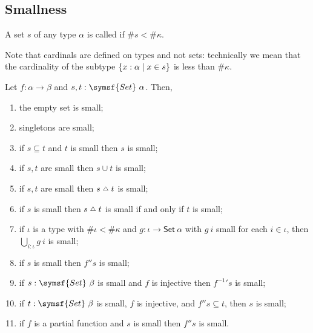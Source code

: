 \subsection{Smallness}

\begin{definition}
    A set \( s \) of any type \( \alpha \) is called  if \( \#s < \#\kappa \).
\end{definition}
\begin{remark}
    Note that cardinals are defined on types and not sets: technically we mean that the cardinality of the subtype \( \qty{x : \alpha \mid x \in s} \) is less than \( \#\kappa \).
\end{remark}
\begin{lemma}
    \label{lem:small}
    Let \( f \colon \alpha \to \beta \) and \( s, t : \symsf{Set}\ \alpha \).
    Then,
    \begin{enumerate}
        \item the empty set is small;
        \item singletons are small;
        \item if \( s \subseteq t \) and \( t \) is small then \( s \) is small;
        \item if \( s, t \) are small then \( s \cup t \) is small;
        \item if \( s, t \) are small then \( s \symmdiff t \) is small;
        \item if \( s \) is small then \( s \symmdiff t \) is small if and only if \( t \) is small;
        \item if \( \iota \) is a type with \( \#\iota < \#\kappa \) and \( g \colon \iota \to \mathsf{Set}\ \alpha \) with \( g\ i \) small for each \( i \in \iota \), then \( \bigcup_{i : \iota} g\ i \) is small;
        \item if \( s \) is small then \( f '' s \) is small;
        \item if \( s : \symsf{Set}\ \beta \) is small and \( f \) is injective then \( f^{-1}{}' s \) is small;
        \item if \( t : \symsf{Set}\ \beta \) is small, \( f \) is injective, and \( f '' s \subseteq t \), then \( s \) is small;
        \item if \( f \) is a partial function and \( s \) is small then \( f '' s \) is small.
    \end{enumerate}
\end{lemma}
